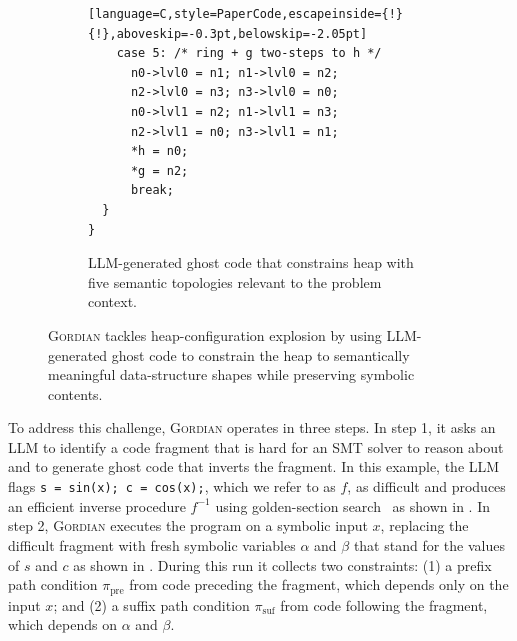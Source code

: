 \documentclass[acmsmall]{acmart}
\newcommand{\projName}{\textsc{Gordian}\xspace}
\theoremstyle{definition}
\begin{document}
\begin{figure}
\begin{subfigure}[b]{0.36\textwidth}
{\begin{lstlisting}[language=C,style=PaperCode,escapeinside={!}{!},aboveskip=-0.3pt,belowskip=-2.05pt]
    case 5: /* ring + g two-steps to h */
      n0->lvl0 = n1; n1->lvl0 = n2;
      n2->lvl0 = n3; n3->lvl0 = n0;
      n0->lvl1 = n2; n1->lvl1 = n3;
      n2->lvl1 = n0; n3->lvl1 = n1;
      *h = n0;
      *g = n2;
      break;
  }
}
\end{lstlisting}
}
    \caption{LLM-generated ghost code that constrains heap with five semantic topologies relevant to the problem context.}
    \label{fig:constrain_heap}
  \end{subfigure}
  \vspace{-2mm}
  \caption{\projName tackles heap-configuration explosion by using LLM-generated ghost code to constrain the heap to semantically meaningful data-structure shapes while preserving symbolic contents.}
  \label{fig:topology_example}
  \vspace{-2mm}  
\end{figure}

To address this challenge, \projName operates in three steps. In step 1, it asks an LLM to identify a code fragment that is hard for an SMT solver to reason about and to generate ghost code that inverts the fragment. In this example, the LLM flags \lstinline[style=PaperCode]|s = sin(x); c = cos(x);|, which we refer to as $f$, as difficult and produces an efficient inverse procedure \(f^{-1}\) using golden-section search~\cite{kiefer1953sequential} as shown in . In step 2, \projName executes the program on a symbolic input \(x\), replacing the difficult fragment with fresh symbolic variables \(\alpha\) and \(\beta\) that stand for the values of \(s\) and \(c\) as shown in . During this run it collects two constraints: (1) a prefix path condition \(\pi_{\mathrm{pre}}\) from code preceding the fragment, which depends only on the input \(x\); and (2) a suffix path condition \(\pi_{\mathrm{suf}}\) from code following the fragment, which depends on \(\alpha\) and \(\beta\).
\end{document}
